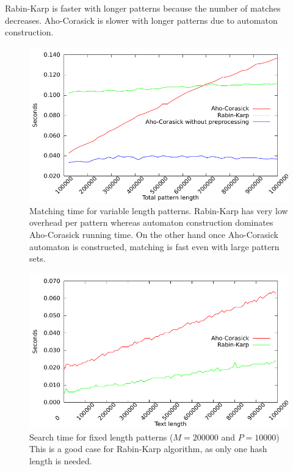 \documentclass[final]{beamer}
\begin{document}
\begin{poster}
\begin{small}
\centering
Rabin-Karp is faster with longer patterns because the number of matches decreases.
Aho-Corasick is slower with longer patterns due to automaton construction.
\end{small}
\vspace{-7mm}

\begin{figure}
{\centering
 \includegraphics[width=25cm]{var_len.pdf}
\caption[Matching time for variable length patterns]
{
Matching time for variable length patterns.
\newline
\newline
Rabin-Karp has very low overhead per pattern whereas 
automaton construction dominates 
Aho-Corasick running time.
On the other hand once Aho-Corasick automaton is constructed,
matching is fast even with large pattern sets.
}
\label{fig:var_len}
}
\end{figure}

\vspace{-7mm}

\begin{figure}
\centering
 \includegraphics[width=25cm]{text_len_fixed.pdf}
\caption{
Search time for fixed length patterns ($M = 200000$ and $P = 10000$)
    \newline
    \newline
This is a good case for Rabin-Karp algorithm, as only one hash length is needed.
}


\end{figure}
\end{poster}
\end{document}

